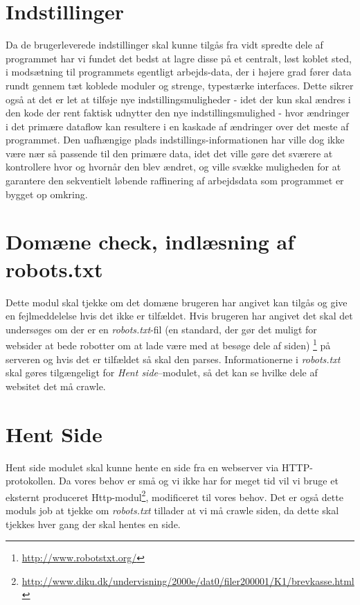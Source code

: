 \documentclass[a4paper,oneside,article, titlepage]{memoir}
\begin{document}
\section{Indstillinger}
Da de brugerleverede indstillinger skal kunne tilgås fra vidt spredte
dele af programmet har vi fundet det bedst at lagre disse på et
centralt, løst koblet sted, i modsætning til programmets egentligt
arbejds-data, der i højere grad fører data rundt gennem tæt koblede
moduler og strenge, typestærke interfaces. Dette sikrer også at det er
let at tilføje nye indstillingsmuligheder - idet der kun skal ændres i
den kode der rent faktisk udnytter den nye indstillingsmulighed - hvor
ændringer i det primære dataflow kan resultere i en kaskade af
ændringer over det meste af programmet. Den uafhængige plads
indstillings-informationen har ville dog ikke være nær så passende til
den primære data, idet det ville gøre det sværere at kontrollere hvor
og hvornår den blev ændret, og ville svække muligheden for at
garantere den sekventielt løbende raffinering af arbejdsdata som
programmet er bygget op omkring.

\section{Domæne check, indlæsning af robots.txt}
Dette modul skal tjekke om det domæne brugeren har angivet kan tilgås
og give en fejlmeddelelse hvis det ikke er tilfældet. Hvis brugeren
har angivet det skal det undersøges om der er en
\textit{robots.txt}-fil (en standard, der gør det muligt for websider
at bede robotter om at lade være med at besøge dele af
siden) \footnote{\url{http://www.robotstxt.org/}} på serveren og hvis
det er tilfældet så skal den parses. Informationerne i
\textit{robots.txt} skal gøres tilgængeligt for \textit{Hent
  side}--modulet, så det kan se hvilke dele af websitet det må crawle.

\section{Hent Side}
Hent side modulet skal kunne hente en side fra en webserver via
HTTP-protokollen. Da vores behov er små og vi ikke har for meget tid
vil vi bruge et eksternt produceret
Http-modul\footnote{\url{http://www.diku.dk/undervisning/2000e/dat0/filer200001/K1/brevkasse.html}},
modificeret til vores behov. Det er også dette moduls job at tjekke om
\textit{robots.txt} tillader at vi må crawle siden, da dette skal tjekkes
hver gang der skal hentes en side.
\end{document}
